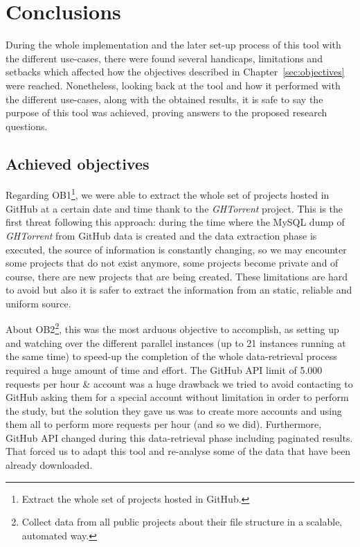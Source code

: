\documentclass[a4paper, 12pt]{book}
\begin{document}
\chapter{Conclusions}
\label{sec:conclusions}
During the whole implementation and the later set-up process of this tool with the different use-cases,
there were found several handicaps, limitations and setbacks which affected how the objectives described
in Chapter~\ref{sec:objectives} were reached. Nonetheless, looking back at the tool and how
it performed with the different use-cases, along with the obtained results, it is safe to
say the purpose of this tool was achieved, proving answers to the proposed research questions.
\section{Achieved objectives}
\label{sec:achieved-objectives}
Regarding OB1\footnote{Extract the whole set of projects hosted in GitHub.},
we were able to extract the whole set of projects hosted in GitHub at
a certain date and time thank to the \emph{GHTorrent} project. This is the first threat
following this approach: during the time where the MySQL dump of \emph{GHTorrent} from GitHub data is created
and the data extraction phase is executed, the source of information is constantly changing,
so we may encounter some projects that do not exist anymore, some projects become private
and of course, there are new projects that are being created. These limitations are hard
to avoid but also it is safer to extract the information from an static, reliable and uniform source.\par
About OB2\footnote{Collect data from all public projects about their file structure in a scalable, automated way.},
this was the most arduous objective to accomplish, as setting up and watching over
the different parallel instances (up to 21 instances running at the same time) to speed-up the completion
of the whole data-retrieval process required a huge amount of time and effort. The GitHub API limit of
5.000 requests per hour \& account was a huge drawback we tried to avoid contacting to GitHub asking them for a special
account without limitation in order to perform the study, but the solution they gave us was to create more accounts
and using them all to perform more requests per hour (and so we did). Furthermore, GitHub API changed during this
data-retrieval phase including paginated results. That forced us to adapt this tool and re-analyse some of the data
that have been already downloaded.\\
\end{document}
